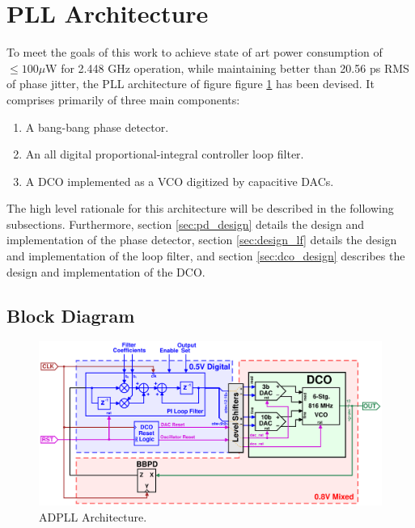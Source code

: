 \section{PLL Architecture}\label{pll_arch}
To meet the goals of this work to achieve state of art power consumption of $\leq 100\mu$W for 2.448 GHz operation, while maintaining better than 20.56 ps RMS of phase jitter, the PLL architecture of figure figure \ref{fig:pll_arch} has been devised. It comprises primarily of three main components:
\begin{enumerate}[itemsep=0pt,label=\protect\mycirc{\arabic*}]
	\setlength\itemsep{-0.8em}
	\item A bang-bang phase detector.
	\item An all digital proportional-integral controller loop filter.
	\item A DCO implemented as a VCO digitized by capacitive DACs.
\end{enumerate}
The high level rationale for this architecture will be described in the following subsections. Furthermore, section \ref{sec:pd_design} details the design and implementation of the phase detector, section \ref{sec:design_lf} details the design and implementation of the loop filter, and section \ref{sec:dco_design} describes the design and implementation of the DCO.

	\subsection{Block Diagram}
			\begin{figure}[htb!]
		        \centering
		        \includegraphics[width=1\textwidth, angle=0]{./figs/design/pll_master_arch_final3}
			    \caption{ADPLL Architecture.}
			    \label{fig:pll_arch}
			\end{figure}

